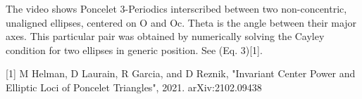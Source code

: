 The video shows Poncelet 3-Periodics interscribed between two non-concentric, unaligned ellipses, centered on O and Oc. Theta is the angle between their major axes. This particular pair was obtained by numerically solving the Cayley condition for two ellipses in generic position. See (Eq. 3)[1].

[1] M Helman, D Laurain, R Garcia, and D Reznik, "Invariant Center Power and Elliptic Loci of Poncelet Triangles", 2021. arXiv:2102.09438